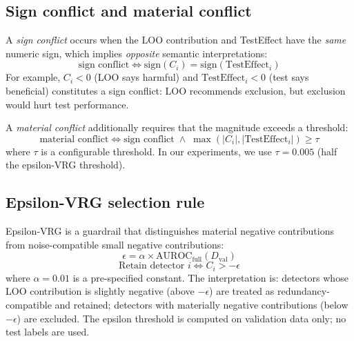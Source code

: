 \subsection{Sign conflict and material conflict}

A \emph{sign conflict} occurs when the LOO contribution and TestEffect have the \emph{same} numeric sign, which implies \emph{opposite} semantic interpretations:
\begin{equation}
\text{sign conflict} \iff \text{sign}(C_i) = \text{sign}(\text{TestEffect}_i)
\label{eq:sign_conflict}
\end{equation}
For example, $C_i < 0$ (LOO says harmful) and $\text{TestEffect}_i < 0$ (test says beneficial) constitutes a sign conflict: LOO recommends exclusion, but exclusion would hurt test performance.

A \emph{material conflict} additionally requires that the magnitude exceeds a threshold:
\begin{equation}
\text{material conflict} \iff \text{sign conflict} \;\wedge\; \max(|C_i|, |\text{TestEffect}_i|) \geq \tau
\label{eq:material_conflict}
\end{equation}
where $\tau$ is a configurable threshold. In our experiments, we use $\tau = 0.005$ (half the epsilon-VRG threshold).

\subsection{Epsilon-VRG selection rule}

Epsilon-VRG is a guardrail that distinguishes material negative contributions from noise-compatible small negative contributions:
\begin{equation}
\epsilon = \alpha \times \text{AUROC}_{\text{full}}(D_{\text{val}})
\label{eq:epsilon}
\end{equation}
\begin{equation}
\text{Retain detector } i \iff C_i > -\epsilon
\label{eq:evrg_rule}
\end{equation}
where $\alpha = 0.01$ is a pre-specified constant. The interpretation is: detectors whose LOO contribution is slightly negative (above $-\epsilon$) are treated as redundancy-compatible and retained; detectors with materially negative contributions (below $-\epsilon$) are excluded. The epsilon threshold is computed on validation data only; no test labels are used.

